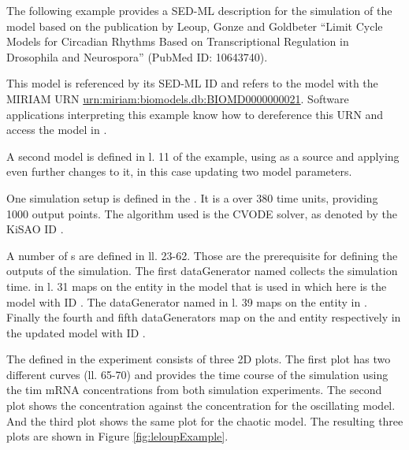 The following example provides a SED-ML description for the simulation of the model based on the publication by Leoup, Gonze and Goldbeter ``Limit Cycle Models for Circadian Rhythms Based on Transcriptional Regulation in Drosophila and Neurospora'' (PubMed ID: 10643740).

This model is referenced by its SED-ML ID   and refers to the model with the MIRIAM URN \url{urn:miriam:biomodels.db:BIOMD0000000021}. 
Software applications interpreting this example know how to dereference this URN and access the model in \biom \citep{N+06}.

A second model is defined in l. 11 of the example, using  as a source and applying even further changes to it, in this case updating two model parameters.

One simulation setup is defined in the . It is a  over 380 time units, providing 1000 output points. The algorithm used is the CVODE solver, as denoted by the KiSAO ID .

A number of s are defined in ll. 23-62. Those are the prerequisite for defining the outputs of the simulation. The first dataGenerator named  collects the simulation time.  in l. 31 maps on the  entity in the model that is used in  which here is the model with ID . The dataGenerator named  in l. 39 maps on the  entity in . Finally  the fourth and fifth dataGenerators map on the  and  entity respectively in the updated model with ID .

The  defined in the experiment consists of three 2D plots. The first plot has two different curves (ll. 65-70) and provides the time course of the simulation using the tim mRNA concentrations from both simulation experiments. The second plot shows the  concentration against the  concentration for the oscillating model. And the third plot shows the same plot for the chaotic model. The resulting three plots are shown in Figure \ref{fig:leloupExample}. 
%
%



